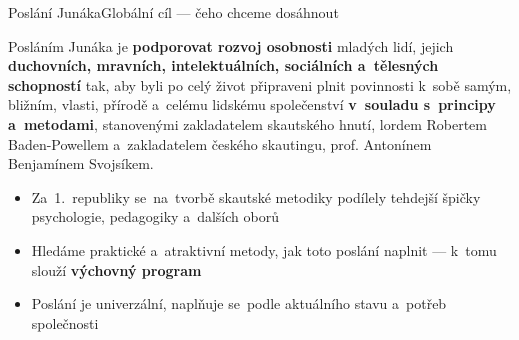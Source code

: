 \documentclass[compress, ucs, xelatex, 11pt, xcolor=dvipsnames, print, aspectratio=169,
	hyperref={
		bookmarks=true,
		unicode=true,
		colorlinks=true,
		pdftitle={Skautska vychovna metoda},
		plainpages=false,
		pdfauthor={Vojtech Zeisek},
		pdfsubject={Skautska vychovna metoda a jeji vyvoj za posledni stoleti a desetileti},
		pdfcreator={XeLaTeX},
		pdfkeywords={Junak, Pedagogika, Skaut, Skauting, Vychovna metoda},
		linkcolor=Red, %
		anchorcolor=ForestGreen, %
		citecolor=ForestGreen, %
		filecolor=ForestGreen, %
		menucolor=ForestGreen, %
		urlcolor=Sepia, %
		pdftex},
	url={hyphens, lowtilde} %
	]{beamer}
\begin{document}
\begin{frame}{Poslání Junáka}{Globální cíl --- čeho chceme dosáhnout}
	\begin{center}
		\begin{Large}
			Posláním Junáka je \textbf{podporovat rozvoj osobnosti} mladých lidí, jejich \textbf{duchovních, mravních, intelektuálních, sociálních a~tělesných schopností} tak, aby byli po celý život připraveni plnit povinnosti k~sobě samým, bližním, vlasti, přírodě a~celému lidskému společenství \textbf{v~souladu s~principy a~metodami}, stanovenými zakladatelem skautského hnutí, lordem Robertem Baden-Powellem a~zakladatelem českého skautingu, prof. Antonínem Benjamínem Svojsíkem.
		\end{Large}
	\end{center}
	\begin{itemize}
		\item Za~1.~republiky se~na~tvorbě skautské metodiky podílely tehdejší špičky psychologie, pedagogiky a~dalších oborů
		\item Hledáme praktické a~atraktivní metody, jak toto poslání naplnit --- k~tomu slouží \textbf{výchovný program}
		\item Poslání je univerzální, naplňuje se~podle aktuálního stavu a~potřeb společnosti
	\end{itemize}
\end{frame}
\end{document}
